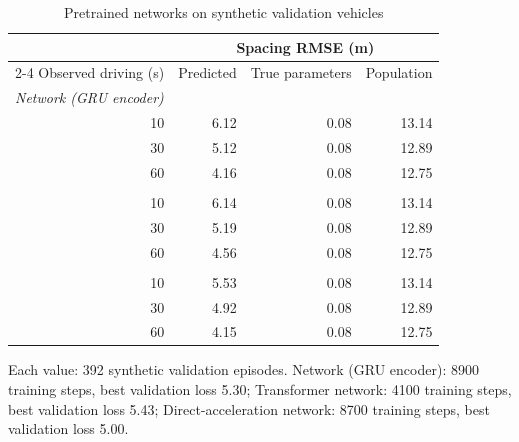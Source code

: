 \begin{table}[t]
\centering
\footnotesize
\setlength{\tabcolsep}{4pt}
\caption{Pretrained networks on synthetic validation vehicles}
\label{tab:pretrain}
\begin{tabular}{rrrr}
\toprule
 & \multicolumn{3}{c}{Spacing RMSE (m)} \\
\cmidrule(lr){2-4}
Observed driving (s) & Predicted & True parameters & Population \\
\midrule
\multicolumn{4}{l}{\textit{Network (GRU encoder)}} \\
10 & 6.12 & 0.08 & 13.14 \\
30 & 5.12 & 0.08 & 12.89 \\
60 & 4.16 & 0.08 & 12.75 \\
\addlinespace
\multicolumn{4}{l}{\textit{Transformer network}} \\
10 & 6.14 & 0.08 & 13.14 \\
30 & 5.19 & 0.08 & 12.89 \\
60 & 4.56 & 0.08 & 12.75 \\
\addlinespace
\multicolumn{4}{l}{\textit{Direct-acceleration network}} \\
10 & 5.53 & 0.08 & 13.14 \\
30 & 4.92 & 0.08 & 12.89 \\
60 & 4.15 & 0.08 & 12.75 \\
\bottomrule
\end{tabular}
\par\smallskip
\parbox{\linewidth}{\footnotesize Each value: 392 synthetic validation episodes. Network (GRU encoder): 8900 training steps, best validation loss 5.30; Transformer network: 4100 training steps, best validation loss 5.43; Direct-acceleration network: 8700 training steps, best validation loss 5.00.}
\end{table}

